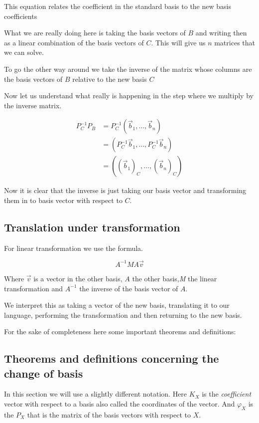 This equation relates the coefficient in the standard basis to the new basis
coefficients

What we are really doing here is taking the basis vectors of \(B\) and writing then as a linear combination
of the basis vectors of \(C\). This will give us \(n\) matrices that we can solve.

To go the other way around we take the inverse of the matrix whose columns are the basis vectors of \(B\)
relative to the new basis \(C\)

Now let us understand what really is happening in the step where we multiply by the inverse matrix.

\begin{align*}
    P_{C}^{-1} P_B &= P_{C}^{-1}(\vec{b}_1, \dots, \vec{b}_n) \\
    &= (P_{C}^{-1}\vec{b}_1, \dots, P_{C}^{-1}\vec{b}_n)\\
    &= ({(\vec{b}_1)}_C, \dots, {(\vec{b}_n)}_C)
\end{align*}

Now it is clear that the inverse is just taking our basis vector and transforming
them in to basis vector with respect to \(C\).

\subsection{Translation under transformation}

For linear transformation we use the formula.

\[
    A^{-1} M A \vec{v}
\]

Where \(\vec{v}\) is a vector in the other basis, \(A\) the
other basis,\emph{M} the linear transformation and \(A^{-1}\) the inverse of
the basis vector of \(A\).

We interpret this as taking a vector of the new basis, translating it to our language,
performing the transformation and then returning to the new basis.

For the sake of completeness here some important theorems and definitions:

\subsection{Theorems and definitions concerning the change of basis}

In this section we will use a slightly different notation. Here \(K_X\) is 
the \emph{coefficient} vector with respect to a basis also called the coordinates
of the vector. And \(\varphi_X\) is the \(P_X\) that is the matrix of the basis vectors with
respect to \(X\).

